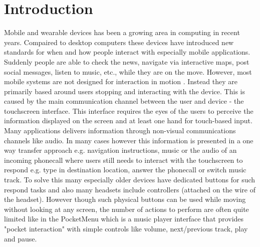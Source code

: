 \chapter{Introduction}
Mobile and wearable devices has been a growing area in computing in recent years. Compaired to desktop computers these devices have introduced new standards for when and how people interact with especially mobile applications. Suddenly people are able to check the news, navigate via interactive maps, post social messages, listen to music, etc., while they are on the move. However, most mobile systems are not designed for interaction in motion \cite{marshall_mobile_2013}. Instead they are primarily based around users stopping and interacting with the device. This is caused by the main communication channel between the user and device - the touchscreen interface. This interface requires the eyes of the users to perceive the information displayed on the screen and at least one hand for touch-based input. Many applications delivers information through non-visual communications channels like audio. In many cases however this information is presented in a one way transfer approach e.g. navigation instructions, music or the audio of an incoming phonecall where users still needs to interact with the touchscreen to respond e.g. type in destination location, answer the phonecall or switch music track. To solve this many especially older devices have dedicated buttons for such respond tasks and also many headsets include controllers (attached on the wire of the headset). However though such physical buttons can be used while moving without looking at any screen, the number of actions to perform are often quite limited like in the PocketMenu \cite{pielot_pocketmenu:_2012} which is a music player interface that provides "pocket interaction" with simple controls like volume, next/previous track, play and pause.

